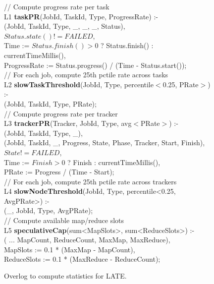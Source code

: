 \begin{figure}[p]
\ssp
\begin{boxedminipage}{\linewidth}

// Compute progress rate per task \\
L1 {\bf taskPR}(JobId, TaskId, Type, ProgressRate) :- \\
(JobId, TaskId, Type, \_, \_, \_, Status), \\
\datalogspace $Status.state() != FAILED$,  \\
\datalogspace Time := $Status.finish() > 0$ ? Status.finish() : currentTimeMillis(), \\
\datalogspace ProgressRate := Status.progress() / (Time - Status.start()); \\

// For each job, compute 25th pctile rate across tasks \\
L2 {\bf slowTaskThreshold}(JobId, Type, percentile$<$0.25, PRate$>$) :- \\
(JobId, TaskId, Type, PRate); \\

// Compute progress rate per tracker \\
L3 {\bf trackerPR}(Tracker, JobId, Type, avg$<$PRate$>$) :- \\ 
(JobId, TaskId, Type, \_), \\
(JobId, TaskId, \_, Progress, State, Phase, Tracker, Start, Finish), \\
\datalogspace $State != FAILED$, \\
\datalogspace Time := $Finish > 0$ ? Finish : currentTimeMillis(), \\ 
\datalogspace PRate := Progress / (Time - Start);  \\

// For each job, compute 25th pctile rate across trackers \\
L4 {\bf slowNodeThreshold}(JobId, Type, percentile<0.25, AvgPRate>) :- \\
(\_, JobId, Type, AvgPRate); \\

// Compute available map/reduce slots \\
L5 {\bf speculativeCap}(sum<MapSlots>, sum<ReduceSlots>) :- \\
( ... MapCount, ReduceCount, MaxMap, MaxReduce), \\
\datalogspace MapSlots := 0.1 * (MaxMap - MapCount), \\
\datalogspace ReduceSlots := 0.1 * (MaxReduce - ReduceCount); \\
\end{boxedminipage}
\caption{Overlog to compute statistics for LATE.}
\label{fig:latePolicy}
\end{figure}

